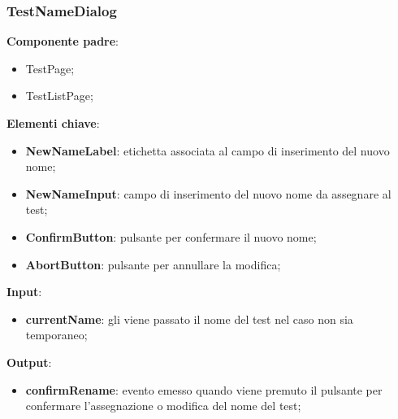 \subsubsection{TestNameDialog}
\textbf{Componente padre}:
\begin{itemize}
    \item TestPage;
    \item TestListPage;
\end{itemize}
\textbf{Elementi chiave}:
\begin{itemize}
    \item \textbf{NewNameLabel}: etichetta associata al campo di inserimento del nuovo nome;
    \item \textbf{NewNameInput}: campo di inserimento del nuovo nome da assegnare al test;
    \item \textbf{ConfirmButton}: pulsante per confermare il nuovo nome;
    \item \textbf{AbortButton}: pulsante per annullare la modifica;
\end{itemize}
\textbf{Input}:
\begin{itemize}
    \item \textbf{currentName}: gli viene passato il nome del test nel caso non sia temporaneo;
\end{itemize}
\textbf{Output}:
\begin{itemize}
    \item \textbf{confirmRename}: evento emesso quando viene premuto il pulsante per confermare l'assegnazione o modifica del nome del test;
\end{itemize}
